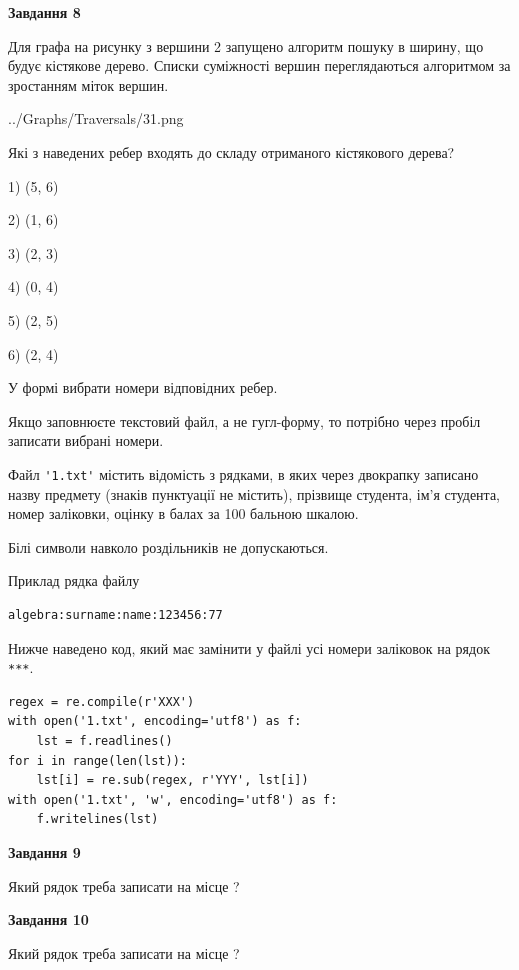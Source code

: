 \documentclass[12pt, ukrainian]{article}
\def\code#1{\Verb!#1!}
\begin{document}
{\begin {large}
{\begin {center}\textbf{Завдання 8}\end {center}}\par
Для графа на рисунку з вершини 2 запущено алгоритм пошуку в ширину, що будує кістякове дерево. Списки суміжності вершин переглядаються алгоритмом за зростанням міток вершин.\par
\begin{center}
	{../Graphs/Traversals/31.png}
\end{center}
\par Які з наведених ребер входять до складу отриманого кістякового дерева?\par
1) (5, 6)\par
2) (1, 6)\par
3) (2, 3)\par
4) (0, 4)\par
5) (2, 5)\par
6) (2, 4)\par
{\vskip 15pt} У формі вибрати номери відповідних ребер.


Якщо заповнюєте текстовий файл, а не гугл-форму, то потрібно через пробіл записа\-ти вибрані номери.\par
\newpage


Файл \code{'1.txt'} містить відомість з рядками, в яких через двокрапку записа\-но назву предмету (знаків пунктуації не містить), прізвище студента, ім'я студента, номер залі\-ков\-ки, оцінку в балах за 100 бальною шкалою.

Білі символи навколо роздільників не допускаються.

Приклад рядка файлу



\begin{verbatim}
algebra:surname:name:123456:77
\end{verbatim}


Нижче наведено код, який має замінити у файлі усі номери заліковок на рядок \code{***}.



\begin{verbatim}
regex = re.compile(r'XXX')
with open('1.txt', encoding='utf8') as f:
    lst = f.readlines()
for i in range(len(lst)):
    lst[i] = re.sub(regex, r'YYY', lst[i])
with open('1.txt', 'w', encoding='utf8') as f:
    f.writelines(lst)
\end{verbatim}




{\begin {center}\textbf{Завдання 9}\end {center}}\par
Який рядок треба записати на місце  ?\par
\vspace{5mm}


{\begin {center}\textbf{Завдання 10}\end {center}}\par
Який рядок треба записати на місце  ?\par


\newpage


\end {large}}
\end{document}
